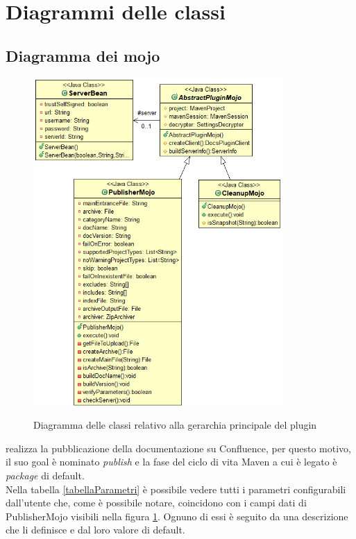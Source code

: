 \clearpage


\section{Diagrammi delle classi}
\label{sec:diagrammi-classi}

\subsection{Diagramma dei mojo} \label{diagrammiMojo}

\begin{figure}[H]
    \centering
    \includegraphics[width=0.85\textwidth]{immagini/mojo-gerarchy.png}\\
    \caption{Diagramma delle classi relativo alla gerarchia principale del plugin}
    \label{diagrammaMojo}
\end{figure}

 realizza la pubblicazione della documentazione su Confluence, per questo motivo, il suo goal è nominato \emph{publish} e la fase del ciclo di vita Maven a cui è legato è \emph{package} di default. \\
Nella tabella \ref{tabellaParametri} è possibile vedere tutti i parametri configurabili dall'utente che, come è possibile notare, coincidono con i campi dati di PublisherMojo visibili nella figura \ref{diagrammaMojo}.
Ognuno di essi è seguito da una descrizione che li definisce e dal loro valore di default.

